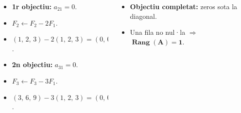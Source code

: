 \documentclass[aspectratio=169]{beamer}
\newcommand{\solucio}[1]{{\color{margueVerdFosc}\ensuremath{\mathbf{#1}}}}
\begin{document}
\begin{frame}[t]
  \vspace{0.08cm}
  \begin{columns}[T,onlytextwidth]
    \begin{column}{0.48\textwidth}
      \begin{itemize}
        \item<4-> \textbf{1r objectiu:} $a_{21} = 0$.
        \item<5-> $F_2 \leftarrow F_2 - 2F_1$.
        \item<6-> $(1,\,2,\,3) - 2(1,\,2,\,3) = (0,\,0,\,0)$.
        \item<7-> \textbf{2n objectiu:} $a_{31} = 0$.
        \item<8-> $F_3 \leftarrow F_3 - 3F_1$.
        \item<9-> $(3,\,6,\,9) - 3(1,\,2,\,3) = (0,\,0,\,0)$.
      \end{itemize}
    \end{column}
    \begin{column}{0.48\textwidth}
      \begin{itemize}
        \item<10-> \textbf{Objectiu completat:} zeros sota la diagonal.
        \item<11-> Una fila no nul·la $\Rightarrow$ \solucio{\operatorname{Rang}(A) = 1}.
      \end{itemize}
    \end{column}
  \end{columns}
\end{frame}
\end{document}

